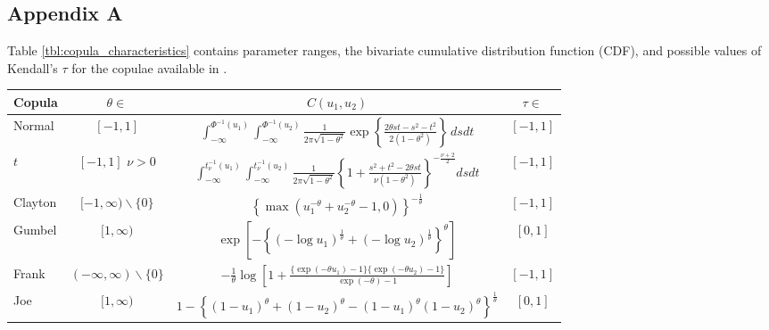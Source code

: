 \newpage
\begin{appendices}
\renewcommand\thetable{A.\arabic{table}}
\renewcommand\thefigure{A.\arabic{figure}}
\setcounter{table}{0}
\renewcommand{\thesubsection}{A.\arabic{subsection}}

\section{Appendix A}\label{sec:Appendix:cop}
\mycolor Table \ref{tbl:copula_characteristics} contains parameter ranges, the bivariate cumulative distribution function (CDF), and possible values of Kendall's $\tau$ for the copulae available in .\bk
\begin{table}[H]
\mycolor
\centering
 \begin{adjustbox}{max width=\textwidth}
\begin{tabular}{lccc}
\toprule
Copula & $\theta \in$ & $C(u_1, u_2)$ & $\tau \in$\\
\midrule
\vspace{0.35cm}
Normal & $[-1,1]$ & $\int_{-\infty}^{\Phi^{-1}(u_1)} \int_{-\infty}^{\Phi^{-1}(u_2)} \frac{1}{2\pi \sqrt{1-\theta^2}} \exp{\left\{\frac{2\theta s t - s^2 -t^2}{2(1-\theta^2)}\right\}} \,ds dt$ & $[-1,1]$\\
\vspace{0.35cm}
$t$ & \makecell{$[-1,1]$ \\ $\nu > 0$} & $\int_{-\infty}^{t_{\nu}^{-1}(u_1)} \int_{-\infty}^{t_{\nu}^{-1}(u_2)} \frac{1}{2\pi \sqrt{1-\theta^2}} \left\{1 + \frac{s^2+t^2-2\theta s t}{\nu(1-\theta^2)}\right\}^{-\frac{\nu+2}{2}} ds dt$ & $[-1,1]$\\
\vspace{0.35cm}
Clayton & $[-1,\infty) \backslash \{0\}$ & $\left\{\max(u_1^{-\theta} + u_2^{-\theta} - 1,0)\right\}^{-\frac{1}{\theta}}$ & $[-1,1]$\\
\vspace{0.35cm}
Gumbel & $[1,\infty)$ & $\exp{\left[ - \left\{ (-\log u_1)^{\frac{1}{\theta}} + (-\log u_2)^{\frac{1}{\theta}}  \right\}^{\theta} \right]}$ & $[0,1]$\\
\vspace{0.35cm}
Frank & $(-\infty, \infty) \backslash \{0\}$ & $-\frac{1}{\theta} \log \left[1+ \frac{\{\exp(-\theta u_1) - 1\}\{\exp(-\theta u_2) - 1\}} {\exp(-\theta) - 1} \right]$ & $[-1,1]$\\
\vspace{0.35cm}
Joe & $[1,\infty)$ & $1- \left\{ (1-u_1)^{\theta} + (1-u_2)^{\theta} - (1-u_1)^{\theta}(1-u_2)^{\theta} \right\}^{\frac{1}{\theta}}$ & $[0,1]$\\

\end{tabular}
\end{adjustbox}
\end{table}
\end{appendices}

